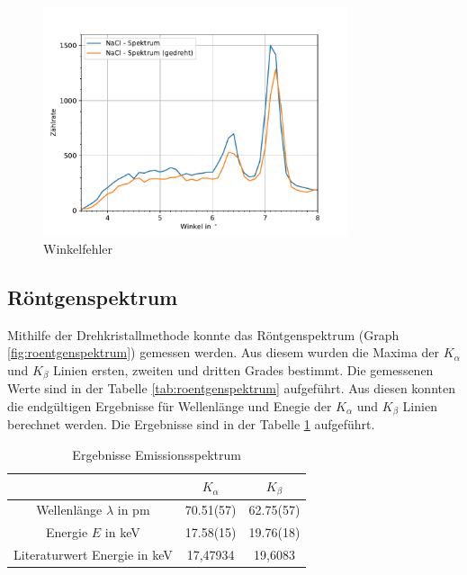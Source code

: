 \documentclass[11pt, a4paper]{article}
\begin{document}
    \begin{figure}
        \centering
        \includegraphics[width=0.8\textwidth]{Winkelfehler.pdf}
        \caption{Winkelfehler}
        \label{fig:wink}
    \end{figure}

    \subsection{Röntgenspektrum} \label{ront}

    Mithilfe der Drehkristallmethode konnte das Röntgenspektrum (Graph \ref{fig:roentgenspektrum}) gemessen werden. Aus diesem wurden die Maxima der $K_{\alpha}$ und $K_{\beta}$ Linien ersten, zweiten und dritten Grades bestimmt. Die gemessenen Werte sind in der Tabelle \ref{tab:roentgenspektrum} aufgeführt. Aus diesen konnten die endgültigen Ergebnisse für Wellenlänge und Enegie der $K_{\alpha}$ und $K_{\beta}$ Linien berechnet werden. Die Ergebnisse sind in der Tabelle \ref{tab:linienerg} aufgeführt.

    \begin{table}
        \centering
        \caption{Ergebnisse Emissionsspektrum}
        \label{tab:linienerg}
        \begin{tabular}{c|c|c}
            & $K_{\alpha}$ & $K_{\beta}$ \\
            \hline
            Wellenlänge $\lambda$ in pm & 70.51(57) & 62.75(57) \\
            Energie $E$ in keV & 17.58(15) & 19.76(18) \\
            Literaturwert Energie \cite{lin} in keV & 17,47934 & 19,6083
        \end{tabular}
    \end{table}
\end{document}

